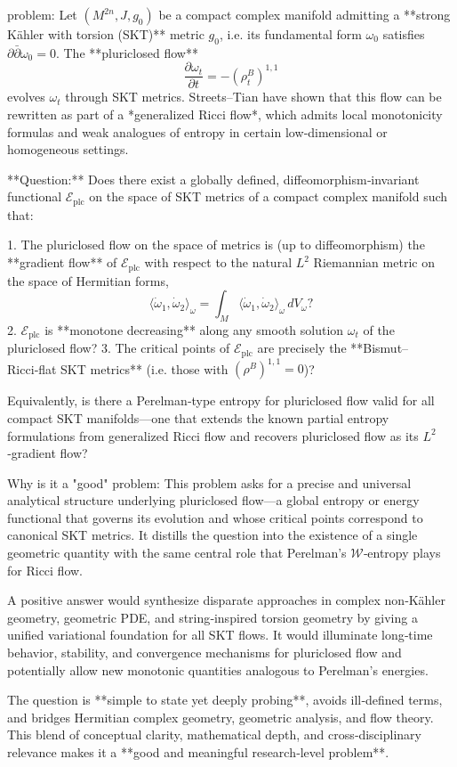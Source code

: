 problem:  
Let \( (M^{2n}, J, g_0) \) be a compact complex manifold admitting a **strong Kähler with torsion (SKT)** metric \( g_0 \), i.e. its fundamental form \( \omega_0 \) satisfies \( \partial\bar{\partial}\omega_0 = 0 \).  
The **pluriclosed flow**
\[
\frac{\partial \omega_t}{\partial t} = -(\rho^B_t)^{1,1}
\]
evolves \( \omega_t \) through SKT metrics. Streets–Tian have shown that this flow can be rewritten as part of a *generalized Ricci flow*, which admits local monotonicity formulas and weak analogues of entropy in certain low‑dimensional or homogeneous settings.

**Question:**  
Does there exist a globally defined, diffeomorphism‑invariant functional \( \mathcal{E}_{\mathrm{plc}} \) on the space of SKT metrics of a compact complex manifold such that:

1. The pluriclosed flow on the space of metrics is (up to diffeomorphism) the **gradient flow** of \( \mathcal{E}_{\mathrm{plc}} \) with respect to the natural \( L^2 \) Riemannian metric on the space of Hermitian forms,  
   \[
   \langle \dot\omega_1, \dot\omega_2 \rangle_\omega = \int_M \langle \dot\omega_1, \dot\omega_2 \rangle_\omega\, dV_\omega?
   \]
2. \( \mathcal{E}_{\mathrm{plc}} \) is **monotone decreasing** along any smooth solution \( \omega_t \) of the pluriclosed flow?  
3. The critical points of \( \mathcal{E}_{\mathrm{plc}} \) are precisely the **Bismut–Ricci‑flat SKT metrics** (i.e. those with \( (\rho^B)^{1,1}=0 \))?

Equivalently, is there a Perelman‑type entropy for pluriclosed flow valid for all compact SKT manifolds—one that extends the known partial entropy formulations from generalized Ricci flow and recovers pluriclosed flow as its \( L^2 \)‑gradient flow?

Why is it a "good" problem:  
This problem asks for a precise and universal analytical structure underlying pluriclosed flow—a global entropy or energy functional that governs its evolution and whose critical points correspond to canonical SKT metrics. It distills the question into the existence of a single geometric quantity with the same central role that Perelman’s \( \mathcal{W} \)‑entropy plays for Ricci flow.  

A positive answer would synthesize disparate approaches in complex non‑Kähler geometry, geometric PDE, and string‑inspired torsion geometry by giving a unified variational foundation for all SKT flows. It would illuminate long‑time behavior, stability, and convergence mechanisms for pluriclosed flow and potentially allow new monotonic quantities analogous to Perelman’s energies.  

The question is **simple to state yet deeply probing**, avoids ill‑defined terms, and bridges Hermitian complex geometry, geometric analysis, and flow theory. This blend of conceptual clarity, mathematical depth, and cross‑disciplinary relevance makes it a **good and meaningful research‑level problem**.